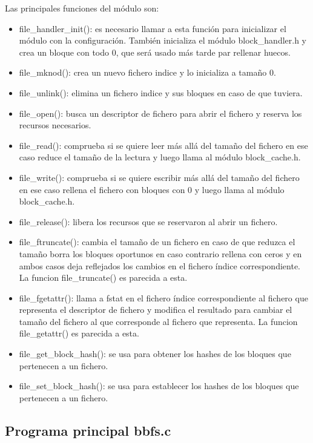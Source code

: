 \documentclass[a4paper,12pt]{article}
\begin{document}
Las principales funciones del módulo son:

\begin{itemize}
\item file\_handler\_init(): es necesario llamar a esta función para inicializar el módulo con la configuración. También inicializa el módulo block\_handler.h y crea un bloque con todo 0, que será  usado más tarde par rellenar huecos.
\item file\_mknod(): crea un nuevo fichero indice y lo inicializa a tamaño 0.
\item file\_unlink(): elimina un fichero indice y sus bloques en caso de que tuviera.
\item file\_open(): busca un descriptor de fichero para abrir el fichero y reserva los recursos necesarios.
\item file\_read(): comprueba si se quiere leer más allá del tamaño del fichero en ese caso reduce el tamaño de la lectura y luego llama al módulo block\_cache.h.
\item file\_write(): comprueba si se quiere escribir más allá del tamaño del fichero en ese caso rellena el fichero con bloques con 0 y luego llama al módulo block\_cache.h.
\item file\_release(): libera los recursos que se reservaron al abrir un fichero.
\item file\_ftruncate(): cambia el tamaño de un fichero en caso de que reduzca el tamaño borra los bloques oportunos en caso contrario rellena con ceros y en ambos casos deja reflejados los cambios en el fichero índice correspondiente. La funcion file\_truncate() es parecida a esta.
\item file\_fgetattr(): llama a fstat en el fichero índice correspondiente al fichero que representa el descriptor de fichero y modifica el resultado para cambiar el tamaño del fichero al que corresponde al fichero que representa. La funcion file\_getattr() es parecida a esta.
\item file\_get\_block\_hash(): se usa para obtener los hashes de los bloques que pertenecen a un fichero.
\item file\_set\_block\_hash(): se usa para establecer los hashes de los bloques que pertenecen a un fichero.
\end{itemize}


\subsection{Programa principal bbfs.c}
\end{document}
